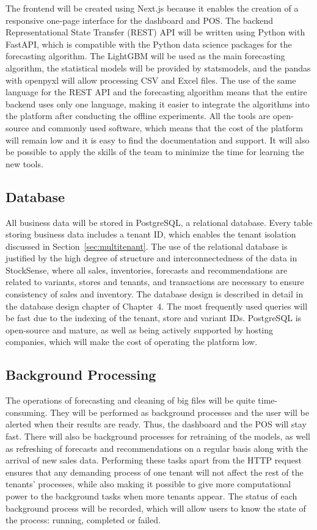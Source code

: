 \documentclass{StockSense}
\begin{document}
The frontend will be created using Next.js because it enables the creation of a responsive one-page interface for the dashboard and POS. The backend Representational State Transfer (REST) API will be written using Python with FastAPI, which is compatible with the Python data science packages for the forecasting algorithm. The LightGBM will be used as the main forecasting algorithm, the statistical models will be provided by statsmodels, and the pandas with openpyxl will allow processing CSV and Excel files. The use of the same language for the REST API and the forecasting algorithm means that the entire backend uses only one language, making it easier to integrate the algorithms into the platform after conducting the offline experiments. All the tools are open-source and commonly used software, which means that the cost of the platform will remain low and it is easy to find the documentation and support. It will also be possible to apply the skills of the team to minimize the time for learning the new tools.

\subsection{Database}

All business data will be stored in PostgreSQL, a relational database. Every table storing business data includes a tenant ID, which enables the tenant isolation discussed in Section~\ref{sec:multitenant}. The use of the relational database is justified by the high degree of structure and interconnectedness of the data in StockSense, where all sales, inventories, forecasts and recommendations are related to variants, stores and tenants, and transactions are necessary to ensure consistency of sales and inventory. The database design is described in detail in the database design chapter of Chapter~4. The most frequently used queries will be fast due to the indexing of the tenant, store and variant IDs. PostgreSQL is open-source and mature, as well as being actively supported by hosting companies, which will make the cost of operating the platform low.

\subsection{Background Processing}

The operations of forecasting and cleaning of big files will be quite time-consuming. They will be performed as background processes and the user will be alerted when their results are ready. Thus, the dashboard and the POS will stay fast. There will also be background processes for retraining of the models, as well as refreshing of forecasts and recommendations on a regular basis along with the arrival of new sales data. Performing these tasks apart from the HTTP request ensures that any demanding process of one tenant will not affect the rest of the tenants’ processes, while also making it possible to give more computational power to the background tasks when more tenants appear. The status of each background process will be recorded, which will allow users to know the state of the process: running, completed or failed.
\end{document}
